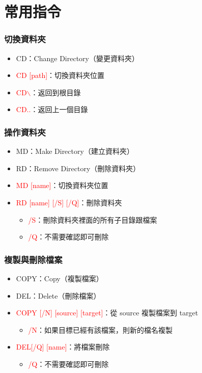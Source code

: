 \documentclass[mathserif]{beamer}
\begin{document}
\section{常用指令}

\begin{frame}
    \frametitle{切換資料夾}
    \begin{itemize}
        \item CD：Change Directory（變更資料夾）
        \vspace{0.5cm}
        \item<2-> \textcolor{red}{CD [path]}：切換資料夾位置
        \item<2-> \textcolor{red}{CD$\backslash$}：返回到根目錄
        \item<2-> \textcolor{red}{CD..}：返回上一個目錄
    \end{itemize}
\end{frame}

\begin{frame}
    \frametitle{操作資料夾}
    \begin{itemize}
        \item MD：Make Directory（建立資料夾）
        \item RD：Remove Directory（刪除資料夾）
        \vspace{0.5cm}
        \item \textcolor{red}{MD [name]}：切換資料夾位置
        \item \textcolor{red}{RD [name] [/S] [/Q]}：刪除資料夾
        \begin{itemize}
            \item \textcolor{red}{/S}：刪除資料夾裡面的所有子目錄跟檔案
            \item \textcolor{red}{/Q}：不需要確認即可刪除
        \end{itemize}
    \end{itemize}
\end{frame}

\begin{frame}
    \frametitle{複製與刪除檔案}
    \begin{itemize}
        \item COPY：Copy（複製檔案）
        \item DEL：Delete（刪除檔案）
        \vspace{0.5cm}
        \item \textcolor{red}{COPY [/N] [source] [target]}：從 source 複製檔案到 target
        \begin{itemize}
            \item \textcolor{red}{/N}：如果目標已經有該檔案，則新的檔名複製
        \end{itemize}
        \item \textcolor{red}{DEL[/Q] [name]}：將檔案刪除
        \begin{itemize}
            \item \textcolor{red}{/Q}：不需要確認即可刪除
        \end{itemize}
    \end{itemize}
\end{frame}
\end{document}
